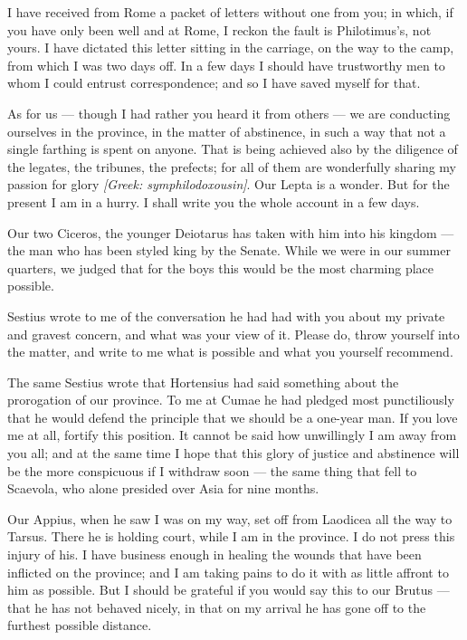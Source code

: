 

 I have received from Rome a packet of letters without one from you; in which, if you have only been well and at Rome, I reckon the fault is Philotimus's, not yours. I have dictated this letter sitting in the carriage, on the way to the camp, from which I was two days off. In a few days I should have trustworthy men to whom I could entrust correspondence; and so I have saved myself for that.

 As for us --- though I had rather you heard it from others --- we are conducting ourselves in the province, in the matter of abstinence, in such a way that not a single farthing is spent on anyone. That is being achieved also by the diligence of the legates, the tribunes, the prefects; for all of them are wonderfully sharing my passion for glory \textit{[Greek: symphilodoxousin]}. Our Lepta is a wonder. But for the present I am in a hurry. I shall write you the whole account in a few days.

 Our two Ciceros, the younger Deiotarus has taken with him into his kingdom --- the man who has been styled king by the Senate. While we were in our summer quarters, we judged that for the boys this would be the most charming place possible.

 Sestius wrote to me of the conversation he had had with you about my private and gravest concern, and what was your view of it. Please do, throw yourself into the matter, and write to me what is possible and what you yourself recommend.

 The same Sestius wrote that Hortensius had said something about the prorogation of our province. To me at Cumae he had pledged most punctiliously that he would defend the principle that we should be a one-year man. If you love me at all, fortify this position. It cannot be said how unwillingly I am away from you all; and at the same time I hope that this glory of justice and abstinence will be the more conspicuous if I withdraw soon --- the same thing that fell to Scaevola, who alone presided over Asia for nine months.

 Our Appius, when he saw I was on my way, set off from Laodicea all the way to Tarsus. There he is holding court, while I am in the province. I do not press this injury of his. I have business enough in healing the wounds that have been inflicted on the province; and I am taking pains to do it with as little affront to him as possible. But I should be grateful if you would say this to our Brutus --- that he has not behaved nicely, in that on my arrival he has gone off to the furthest possible distance.
